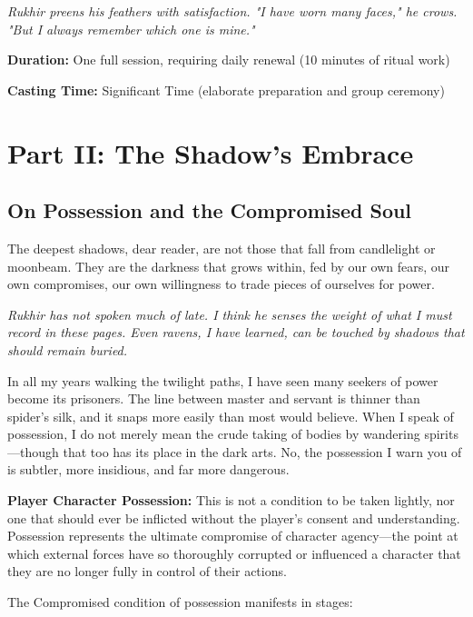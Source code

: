 \documentclass[12pt,twoside]{book}
\newcommand{\shadow}[1]{\textit{#1}}
\begin{document}
\shadow{Rukhir preens his feathers with satisfaction. "I have worn many faces," he crows. "But I always remember which one is mine."}

\textbf{Duration:} One full session, requiring daily renewal (10 minutes of ritual work)

\textbf{Casting Time:} Significant Time (elaborate preparation and group ceremony)

\chapter{Part II: The Shadow's Embrace}

\section*{On Possession and the Compromised Soul}

\lettrine[lines=3]{T}{}he deepest shadows, dear reader, are not those that fall from candlelight or moonbeam. They are the darkness that grows within, fed by our own fears, our own compromises, our own willingness to trade pieces of ourselves for power. 

\shadow{Rukhir has not spoken much of late. I think he senses the weight of what I must record in these pages. Even ravens, I have learned, can be touched by shadows that should remain buried.}

In all my years walking the twilight paths, I have seen many seekers of power become its prisoners. The line between master and servant is thinner than spider's silk, and it snaps more easily than most would believe. When I speak of possession, I do not merely mean the crude taking of bodies by wandering spirits—though that too has its place in the dark arts. No, the possession I warn you of is subtler, more insidious, and far more dangerous.

\textbf{Player Character Possession:} This is not a condition to be taken lightly, nor one that should ever be inflicted without the player's consent and understanding. Possession represents the ultimate compromise of character agency—the point at which external forces have so thoroughly corrupted or influenced a character that they are no longer fully in control of their actions.

The Compromised condition of possession manifests in stages:
\end{document}
